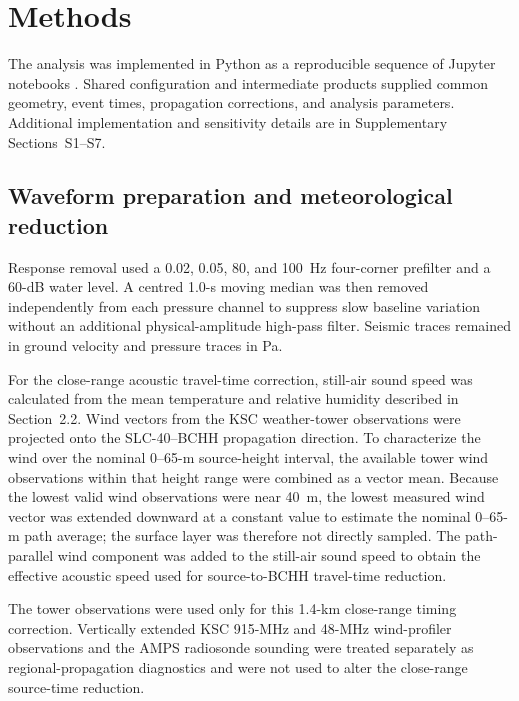 \documentclass[]{seismica}
\begin{document}
\FloatBarrier

\section{Methods}
\label{sec:methods}

The analysis was implemented in Python as a reproducible sequence of Jupyter
notebooks \citep{kluyver2016jupyter}. Shared configuration and intermediate
products supplied common geometry, event times, propagation corrections, and
analysis parameters. Additional implementation and sensitivity details are in
Supplementary Sections~S1--S7.

\subsection{Waveform preparation and meteorological reduction}

Response removal used a 0.02, 0.05, 80, and 100~Hz four-corner prefilter and a
60-dB water level. A centred 1.0-s moving median was then removed independently
from each pressure channel to suppress slow baseline variation without an
additional physical-amplitude high-pass filter. Seismic traces remained in
ground velocity and pressure traces in Pa.

For the close-range acoustic travel-time correction, still-air sound speed was
calculated from the mean temperature and relative humidity described in
Section~2.2. Wind vectors from the KSC weather-tower observations were
projected onto the SLC-40--BCHH propagation direction. To characterize the wind
over the nominal 0--65-m source-height interval, the available tower wind
observations within that height range were combined as a vector mean. Because
the lowest valid wind observations were near 40~m, the lowest measured wind
vector was extended downward at a constant value to estimate the nominal
0--65-m path average; the surface layer was therefore not directly sampled.
The path-parallel wind component was added to the still-air sound speed to
obtain the effective acoustic speed used for source-to-BCHH travel-time
reduction.

The tower observations were used only for this 1.4-km close-range timing
correction. Vertically extended KSC 915-MHz and 48-MHz wind-profiler
observations and the AMPS radiosonde sounding were treated separately as
regional-propagation diagnostics and were not used to alter the close-range
source-time reduction.
\end{document}
